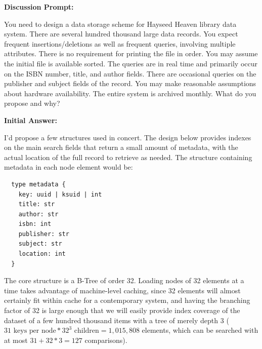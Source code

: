 \documentclass[10pt,letterpaper,final]{report}
\begin{document}
\begin{center}
  \vline
\end{center}


\medskip

\noindent\textbf{Discussion Prompt:}

You need to design a data storage scheme for Hayseed Heaven library data system. There are several hundred thousand large data records. You expect frequent insertions/deletions as well as frequent queries, involving multiple attributes. There is no requirement for printing the file in order. You may assume the initial file is available sorted. The queries are in real time and primarily occur on the ISBN number, title, and author fields. There are occasional queries on the publisher and subject fields of the record. You may make reasonable assumptions about hardware availability. The entire system is archived monthly. What do you propose and why?

\medskip
\noindent\textbf{Initial Answer:}
\medskip

I'd propose a few structures used in concert. The design below provides indexes on the main search fields that return a small amount of metadata, with the actual location of the full record to retrieve as needed. The structure containing metadata in each node element would be:

\begin{verbatim}
  type metadata {
    key: uuid | ksuid | int
    title: str
    author: str
    isbn: int
    publisher: str
    subject: str
    location: int
  }
\end{verbatim}

The core structure is a B-Tree of order 32. Loading nodes of 32 elements at a time takes advantage of machine-level caching, since 32 elements will almost certainly fit within cache for a contemporary system, and having the branching factor of 32 is large enough that we will easily provide index coverage of the dataset of a few hundred thousand items with a tree of merely depth 3 ($31\text{ keys per node} * 32^3 \text{ children} = 1,015,808$ elements, which can be searched with at most $31 + 32*3 = 127$ comparisons).
\end{document}

